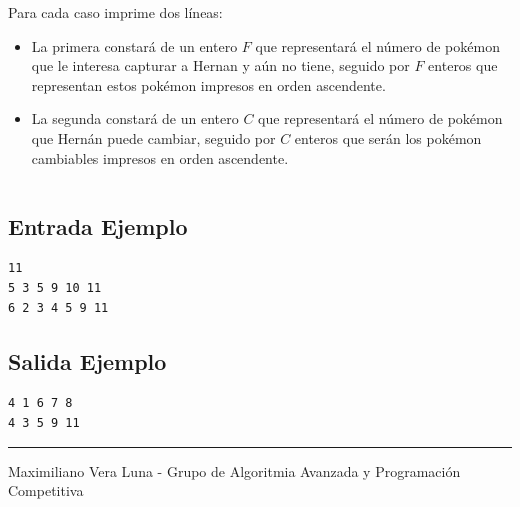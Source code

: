 \documentclass[letter,10pt]{article}
\newcommand{\lyxaddress}[1]{
\par {\raggedright #1
\vspace{1.4em}
\noindent\par}
}
\begin{document}
Para cada caso imprime dos líneas:
\begin{itemize}
\item La primera constará de un entero $F$ que representará el número de pokémon que le interesa capturar a Hernan y aún no tiene, seguido por $F$ enteros que representan estos pokémon impresos en orden ascendente.
\item La segunda constará de un entero $C$ que representará el número de pokémon que Hernán puede cambiar, seguido por $C$ enteros que serán los pokémon cambiables impresos en orden ascendente.
\end{itemize}
$$$$
$$$$
$$$$
$$$$
\subsection*{Entrada Ejemplo}
\begin{verbatim}
11
5 3 5 9 10 11 
6 2 3 4 5 9 11 
\end{verbatim}

\subsection*{Salida Ejemplo}

\begin{verbatim}
4 1 6 7 8
4 3 5 9 11
\end{verbatim}

\noindent \rule[0.5ex]{1\columnwidth}{1pt}


\lyxaddress{Maximiliano Vera Luna - Grupo de Algoritmia Avanzada y Programación Competitiva}
\end{document}
